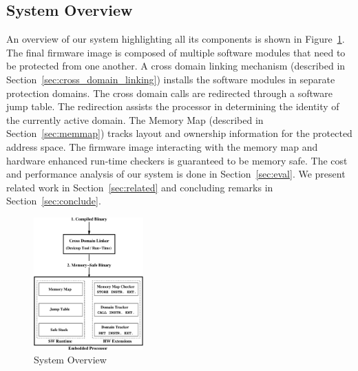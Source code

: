 \subsection{System Overview}
%
An overview of our system highlighting all its components is shown in Figure~\ref{fig:sys_overview}.
%
The final firmware image is composed of multiple software modules that need to be protected from one another.
%
%
A cross domain linking mechanism (described in Section~\ref{sec:cross_domain_linking}) installs the software modules in separate protection domains.
%
The cross domain calls are redirected through a software jump table.
%
The redirection assists the processor in determining the identity of the currently active domain.
%
The Memory Map (described in Section~\ref{sec:memmap}) tracks layout and ownership information for the protected address space.
%
The firmware image interacting with the memory map and hardware enhanced run-time checkers is guaranteed to be memory safe.
%
The cost and performance analysis of our system is done in Section~\ref{sec:eval}.
%
We present related work in Section~\ref{sec:related} and concluding remarks in Section~\ref{sec:conclude}.
%
\begin{figure}[htbp]
   \centering
   \includegraphics[height = 2.0in, keepaspectratio=true]{figures/sysoverview.eps} 
   \caption{System Overview}
   \label{fig:sys_overview}
\end{figure}
%





